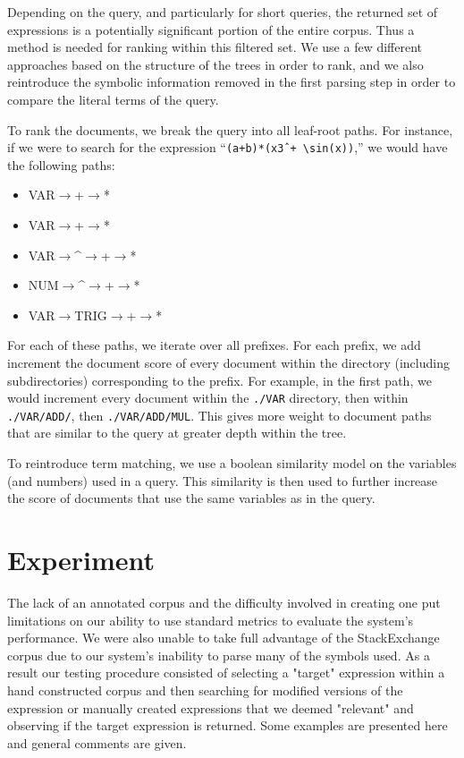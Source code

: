 \documentclass{sig-alternate}
\begin{document}
Depending on the query, and particularly for short queries, the returned set of expressions is a potentially
significant portion of the entire corpus. Thus a method is needed for ranking within this filtered set. We 
use a few different approaches based on the structure of the trees in order to rank, and we also reintroduce
the symbolic information removed in the first parsing step in order to compare the literal terms of the query.

To rank the documents, we break the query into all leaf-root paths.  For instance, if we were to search for the expression ``\texttt{(a+b)*(x\^3 + \textbackslash sin(x))},'' we would have the following paths:
\begin{itemize}
\item VAR$\rightarrow$+$\rightarrow$*
\item VAR$\rightarrow$+$\rightarrow$*
\item VAR$\rightarrow$\textasciicircum$\rightarrow$+$\rightarrow$*
\item NUM$\rightarrow$\textasciicircum$\rightarrow$+$\rightarrow$*
\item VAR$\rightarrow$TRIG$\rightarrow$+$\rightarrow$*
\end{itemize}

For each of these paths, we iterate over all prefixes.  For each prefix, we add increment the document score of every document within the directory (including subdirectories) corresponding to the prefix.  For example, in the first path, we would increment every document within the \texttt{./VAR} directory, then within \texttt{./VAR/ADD/}, then \texttt{./VAR/ADD/MUL}.  This gives more weight to document paths that are similar to the query at greater depth within the tree.

To reintroduce term matching, we use a boolean similarity  model on the variables (and numbers) used in a query.  This similarity is then used to further increase the score of documents that use the same variables as in the query.


\section{Experiment}
The lack of an annotated corpus and the difficulty involved in creating one put limitations on our ability
to use standard metrics to evaluate the system's performance. We were also unable to take full advantage of the 
StackExchange corpus due to our system's inability to parse many of the symbols used. As a result our testing procedure consisted of selecting a "target" expression within a hand constructed corpus and then searching for modified versions of the expression or manually created expressions that we deemed "relevant" and observing if the target expression is returned. Some examples are presented here and general comments are given. 
\end{document}

